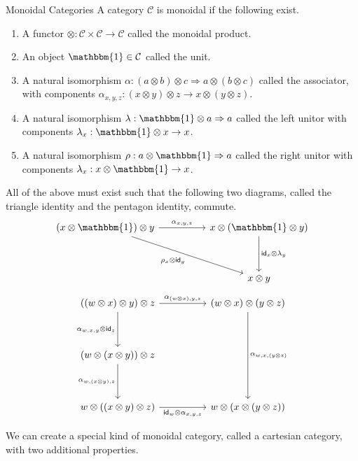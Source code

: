 \documentclass[12pt]{article}
\begin{document}
\begin{definition}{Monoidal Categories}{}
  A category $\mathcal{C}$ is monoidal if the following exist.
  \begin{enumerate}
    \item A functor $\otimes:\mathcal{C}\times\mathcal{C}\rightarrow\mathcal{C}$ called the monoidal product.
    \item An object $\mathbbm{1}\in\mathcal{C}$ called the unit.
    \item A natural isomorphism $\alpha : (a\otimes b)\otimes c\Rightarrow a\otimes (b\otimes c)$ called the associator, with components $\alpha_{x,y,z}: (x\otimes y)\otimes z\rightarrow x\otimes (y\otimes z)$.
    \item A natural isomorphism $\lambda : \mathbbm{1}\otimes a\Rightarrow a$ called the left unitor with components $\lambda_x : \mathbbm{1}\otimes x\rightarrow x$.
    \item A natural isomorphism $\rho : a\otimes \mathbbm{1}\Rightarrow a$ called the right unitor with components $\lambda_x : x\otimes \mathbbm{1}\rightarrow x$.
  \end{enumerate}
  All of the above must exist such that the following two diagrams, called the triangle identity and the pentagon identity, commute.
  \[\begin{tikzcd}
      {(x\otimes\mathbbm{1})\otimes y} && {x\otimes(\mathbbm{1}\otimes y)} \\
      \\
      && {x\otimes y}
      \arrow["{{\rho_x\otimes \mathsf{id}_y}}"', from=1-1, to=3-3]
      \arrow["{{\mathsf{id}_x\otimes\lambda_y}}", from=1-3, to=3-3]
      \arrow["{{\alpha_{x,y,z}}}", from=1-1, to=1-3]
    \end{tikzcd}\]
  \[\begin{tikzcd}
      {((w\otimes x)\otimes y)\otimes z} && {(w\otimes x)\otimes(y\otimes z)} \\
      \\
      {(w\otimes (x\otimes y))\otimes z} \\
      \\
      {w\otimes ((x\otimes y)\otimes z)} && {w\otimes (x\otimes (y\otimes z))}
      \arrow["{{\alpha_{w,x,(y\otimes z)}}}", from=1-3, to=5-3]
      \arrow["{{\alpha_{(w\otimes x),y,z}}}", from=1-1, to=1-3]
      \arrow["{{\alpha_{w,x,y}\otimes \mathsf{id}_z}}"', from=1-1, to=3-1]
      \arrow["{{\alpha_{w,(x\otimes y),z}}}"', from=3-1, to=5-1]
      \arrow["{{\mathsf{id}_w\otimes \alpha_{x,y,z}}}"', from=5-1, to=5-3]
    \end{tikzcd}\]
\end{definition}
We can create a special kind of monoidal category, called a cartesian category, with two additional properties.
\end{document}
